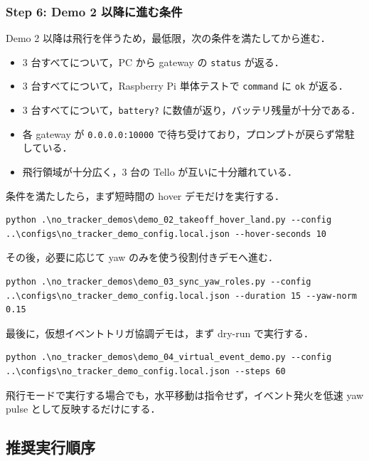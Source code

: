 \subsubsection{Step 6: Demo 2 以降に進む条件}

Demo 2 以降は飛行を伴うため，最低限，次の条件を満たしてから進む．

\begin{itemize}
  \item 3 台すべてについて，PC から gateway の \texttt{status} が返る．
  \item 3 台すべてについて，Raspberry Pi 単体テストで \texttt{command} に \texttt{ok} が返る．
  \item 3 台すべてについて，\texttt{battery?} に数値が返り，バッテリ残量が十分である．
  \item 各 gateway が \texttt{0.0.0.0:10000} で待ち受けており，プロンプトが戻らず常駐している．
  \item 飛行領域が十分広く，3 台の Tello が互いに十分離れている．
\end{itemize}

条件を満たしたら，まず短時間の hover デモだけを実行する．

\begin{lstlisting}
python .\no_tracker_demos\demo_02_takeoff_hover_land.py --config ..\configs\no_tracker_demo_config.local.json --hover-seconds 10
\end{lstlisting}

その後，必要に応じて yaw のみを使う役割付きデモへ進む．

\begin{lstlisting}
python .\no_tracker_demos\demo_03_sync_yaw_roles.py --config ..\configs\no_tracker_demo_config.local.json --duration 15 --yaw-norm 0.15
\end{lstlisting}

最後に，仮想イベントトリガ協調デモは，まず dry-run で実行する．

\begin{lstlisting}
python .\no_tracker_demos\demo_04_virtual_event_demo.py --config ..\configs\no_tracker_demo_config.local.json --steps 60
\end{lstlisting}

飛行モードで実行する場合でも，水平移動は指令せず，イベント発火を低速 yaw pulse として反映するだけにする．

\subsection{推奨実行順序}

